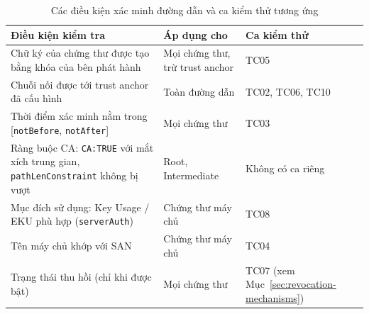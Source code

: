 \begin{table}[!htbp]
\centering
\small
\renewcommand{\arraystretch}{1.15}
\begin{tabularx}{\textwidth}{>{\raggedright\arraybackslash}X>{\raggedright\arraybackslash}p{4.2cm}>{\raggedright\arraybackslash}p{2.8cm}}
\toprule
\textbf{Điều kiện kiểm tra} & \textbf{Áp dụng cho} & \textbf{Ca kiểm thử} \\
\midrule
Chữ ký của chứng thư được tạo bằng khóa của bên phát hành & Mọi chứng thư, trừ trust anchor & TC05 \\
\midrule
Chuỗi nối được tới trust anchor đã cấu hình & Toàn đường dẫn & TC02, TC06, TC10 \\
\midrule
Thời điểm xác minh nằm trong [\texttt{notBefore}, \texttt{notAfter}] & Mọi chứng thư & TC03 \\
\midrule
Ràng buộc CA: \texttt{CA:TRUE} với mắt xích trung gian, \texttt{pathLenConstraint} không bị vượt & Root, Intermediate & Không có ca riêng \\
\midrule
Mục đích sử dụng: Key Usage / EKU phù hợp (\texttt{serverAuth}) & Chứng thư máy chủ & TC08 \\
\midrule
Tên máy chủ khớp với SAN & Chứng thư máy chủ & TC04 \\
\midrule
Trạng thái thu hồi (chỉ khi được bật) & Mọi chứng thư & TC07 (xem Mục~\ref{sec:revocation-mechanisms}) \\
\bottomrule
\end{tabularx}
\caption{Các điều kiện xác minh đường dẫn và ca kiểm thử tương ứng}
\label{tab:path-validation-conditions}
\end{table}
